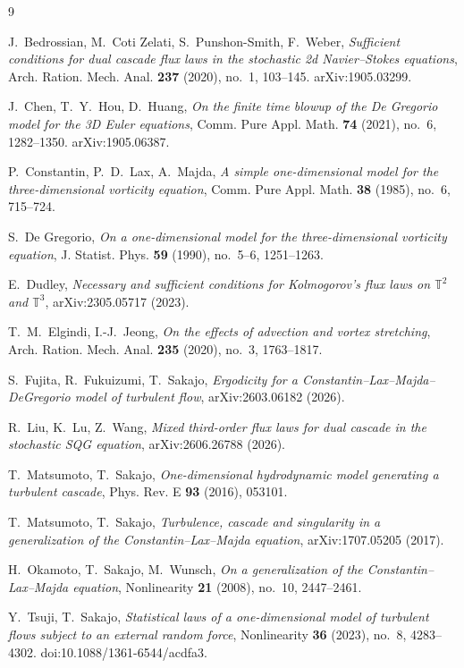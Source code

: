 \documentclass[11pt]{article}
\theoremstyle{remark}
\theoremstyle{plain}
\begin{document}
\begin{thebibliography}{9}

 J.~Bedrossian, M.~Coti Zelati, S.~Punshon-Smith, F.~Weber,
  \emph{Sufficient conditions for dual cascade flux laws in the stochastic 2d
  Navier--Stokes equations}, Arch. Ration. Mech. Anal. \textbf{237} (2020), no.~1,
  103--145. arXiv:1905.03299.

 J.~Chen, T.~Y.~Hou, D.~Huang,
  \emph{On the finite time blowup of the De Gregorio model for the 3D Euler
  equations}, Comm. Pure Appl. Math. \textbf{74} (2021), no.~6, 1282--1350.
  arXiv:1905.06387.

 P.~Constantin, P.~D.~Lax, A.~Majda,
  \emph{A simple one-dimensional model for the three-dimensional vorticity
  equation}, Comm. Pure Appl. Math. \textbf{38} (1985), no.~6, 715--724.

 S.~De Gregorio,
  \emph{On a one-dimensional model for the three-dimensional vorticity equation},
  J. Statist. Phys. \textbf{59} (1990), no.~5--6, 1251--1263.

 E.~Dudley,
  \emph{Necessary and sufficient conditions for Kolmogorov's flux laws on
  $\mathbb{T}^2$ and $\mathbb{T}^3$}, arXiv:2305.05717 (2023).

 T.~M.~Elgindi, I.-J.~Jeong,
  \emph{On the effects of advection and vortex stretching},
  Arch. Ration. Mech. Anal. \textbf{235} (2020), no.~3, 1763--1817.

 S.~Fujita, R.~Fukuizumi, T.~Sakajo,
  \emph{Ergodicity for a Constantin--Lax--Majda--DeGregorio model of turbulent
  flow}, arXiv:2603.06182 (2026).

 R.~Liu, K.~Lu, Z.~Wang,
  \emph{Mixed third-order flux laws for dual cascade in the stochastic SQG
  equation}, arXiv:2606.26788 (2026).

 T.~Matsumoto, T.~Sakajo,
  \emph{One-dimensional hydrodynamic model generating a turbulent cascade},
  Phys. Rev. E \textbf{93} (2016), 053101.

 T.~Matsumoto, T.~Sakajo,
  \emph{Turbulence, cascade and singularity in a generalization of the
  Constantin--Lax--Majda equation}, arXiv:1707.05205 (2017).

 H.~Okamoto, T.~Sakajo, M.~Wunsch,
  \emph{On a generalization of the Constantin--Lax--Majda equation},
  Nonlinearity \textbf{21} (2008), no.~10, 2447--2461.

 Y.~Tsuji, T.~Sakajo,
  \emph{Statistical laws of a one-dimensional model of turbulent flows subject
  to an external random force}, Nonlinearity \textbf{36} (2023), no.~8, 4283--4302.
  doi:10.1088/1361-6544/acdfa3.

\end{thebibliography}
\end{document}

